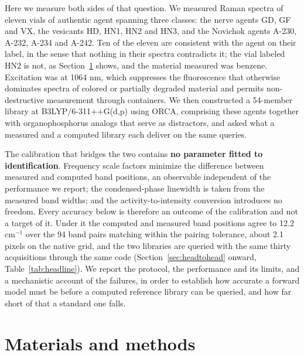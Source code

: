 \documentclass[review,12pt]{elsarticle}
\newcommand*\wn{\ensuremath{\text{cm}^{-1}}}
\begin{document}
Here we measure both sides of that question. We measured Raman spectra of eleven vials of authentic agent spanning three classes: the nerve agents GD, GF and VX, the vesicants HD, HN1, HN2 and HN3, and the Novichok agents A-230, A-232, A-234 and A-242. Ten of the eleven are consistent with the agent on their label, in the sense that nothing in their spectra contradicts it; the vial labeled HN2 is not, as Section~\ref{sec:materials} shows, and the material measured was benzene. Excitation was at 1064 nm, which suppresses the fluorescence that otherwise dominates spectra of colored or partially degraded material and permits non-destructive measurement through containers.\cite{wiktelius2018portable} We then constructed a 54-member library at B3LYP/6-311++G(d,p)\cite{becke1993density,lee1988development,stephens1994abinitio} using ORCA,\cite{neese2020orca,neese2022software} comprising these agents together with organophosphorus analogs that serve as distractors, and asked what a measured and a computed library each deliver on the same queries.

The calibration that bridges the two contains \textbf{no parameter fitted to identification}. Frequency scale factors minimize the difference between measured and computed band positions, an observable independent of the performance we report; the condensed-phase linewidth is taken from the measured band widths; and the activity-to-intensity conversion introduces no freedom. Every accuracy below is therefore an outcome of the calibration and not a target of it. Under it the computed and measured band positions agree to 12.2\,\wn{} over the 94 band pairs matching within the pairing tolerance, about 2.1 pixels on the native grid, and the two libraries are queried with the same thirty acquisitions through the same code (Section~\ref{sec:headtohead} onward, Table~\ref{tab:headline}). We report the protocol, the performance and its limits, and a mechanistic account of the failures, in order to establish how accurate a forward model must be before a computed reference library can be queried, and how far short of that a standard one falls.

\section{Materials and methods}
\label{sec:materials}
\end{document}
